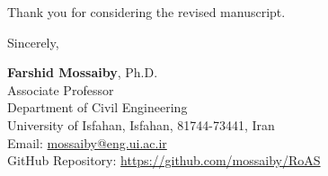 \documentclass[11pt]{article}
\begin{document}
Thank you for considering the revised manuscript.

\vspace{1.5em}
Sincerely,

\vspace{0.5em}
\textbf{Farshid Mossaiby}, Ph.D.\\
Associate Professor\\
Department of Civil Engineering\\
University of Isfahan, Isfahan, 81744-73441, Iran\\
Email: \href{mailto:mossaiby@eng.ui.ac.ir}{mossaiby@eng.ui.ac.ir}\\
GitHub Repository: \url{https://github.com/mossaiby/RoAS}
\end{document}
